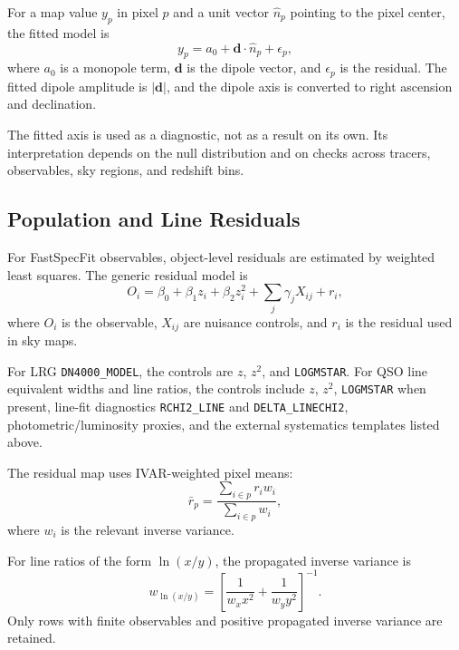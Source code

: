 \documentclass[11pt]{article}
\begin{document}
For a map value $y_p$ in pixel $p$ and a unit vector $\hat{n}_p$ pointing to the pixel center, the fitted model is
\begin{equation}
    y_p = a_0 + \mathbf{d}\cdot \hat{n}_p + \epsilon_p ,
\end{equation}
where $a_0$ is a monopole term, $\mathbf{d}$ is the dipole vector, and $\epsilon_p$ is the residual. The fitted dipole amplitude is $|\mathbf{d}|$, and the dipole axis is converted to right ascension and declination.

The fitted axis is used as a diagnostic, not as a result on its own. Its interpretation depends on the null distribution and on checks across tracers, observables, sky regions, and redshift bins.

\subsection{Population and Line Residuals}

For FastSpecFit observables, object-level residuals are estimated by weighted least squares. The generic residual model is
\begin{equation}
    O_i = \beta_0 + \beta_1 z_i + \beta_2 z_i^2 + \sum_j \gamma_j X_{ij} + r_i ,
\end{equation}
where $O_i$ is the observable, $X_{ij}$ are nuisance controls, and $r_i$ is the residual used in sky maps.

For LRG \texttt{DN4000\_MODEL}, the controls are $z$, $z^2$, and \texttt{LOGMSTAR}. For QSO line equivalent widths and line ratios, the controls include $z$, $z^2$, \texttt{LOGMSTAR} when present, line-fit diagnostics \texttt{RCHI2\_LINE} and \texttt{DELTA\_LINECHI2}, photometric/luminosity proxies, and the external systematics templates listed above.

The residual map uses IVAR-weighted pixel means:
\begin{equation}
    \bar{r}_p =
    \frac{\sum_{i\in p} r_i w_i}{\sum_{i\in p} w_i},
\end{equation}
where $w_i$ is the relevant inverse variance.

For line ratios of the form $\ln(x/y)$, the propagated inverse variance is
\begin{equation}
    w_{\ln(x/y)}
    =
    \left[
    \frac{1}{w_x x^2}
    +
    \frac{1}{w_y y^2}
    \right]^{-1}.
\end{equation}
Only rows with finite observables and positive propagated inverse variance are retained.
\end{document}
